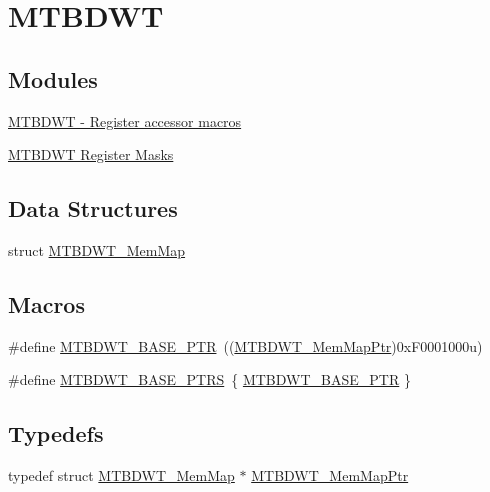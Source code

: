 \hypertarget{group___m_t_b_d_w_t___peripheral}{}\section{M\+T\+B\+D\+WT}
\label{group___m_t_b_d_w_t___peripheral}
\subsection*{Modules}
\begin{DoxyCompactItemize}
\item 
\hyperlink{group___m_t_b_d_w_t___register___accessor___macros}{M\+T\+B\+D\+W\+T -\/ Register accessor macros}
\item 
\hyperlink{group___m_t_b_d_w_t___register___masks}{M\+T\+B\+D\+W\+T Register Masks}
\end{DoxyCompactItemize}
\subsection*{Data Structures}
\begin{DoxyCompactItemize}
\item 
struct \hyperlink{struct_m_t_b_d_w_t___mem_map}{M\+T\+B\+D\+W\+T\+\_\+\+Mem\+Map}
\end{DoxyCompactItemize}
\subsection*{Macros}
\begin{DoxyCompactItemize}
\item 
\#define \hyperlink{group___m_t_b_d_w_t___peripheral_ga97d048bfb5a11293a38c444b8347ff42}{M\+T\+B\+D\+W\+T\+\_\+\+B\+A\+S\+E\+\_\+\+P\+TR}~((\hyperlink{group___m_t_b_d_w_t___peripheral_ga8dd9bf791ed255926ccd995a6236caaf}{M\+T\+B\+D\+W\+T\+\_\+\+Mem\+Map\+Ptr})0x\+F0001000u)
\item 
\#define \hyperlink{group___m_t_b_d_w_t___peripheral_ga0cbd89263cdbe0c07c59ed21112ea9ad}{M\+T\+B\+D\+W\+T\+\_\+\+B\+A\+S\+E\+\_\+\+P\+T\+RS}~\{ \hyperlink{group___m_t_b_d_w_t___peripheral_ga97d048bfb5a11293a38c444b8347ff42}{M\+T\+B\+D\+W\+T\+\_\+\+B\+A\+S\+E\+\_\+\+P\+TR} \}
\end{DoxyCompactItemize}
\subsection*{Typedefs}
\begin{DoxyCompactItemize}
\item 
typedef struct \hyperlink{struct_m_t_b_d_w_t___mem_map}{M\+T\+B\+D\+W\+T\+\_\+\+Mem\+Map} $\ast$ \hyperlink{group___m_t_b_d_w_t___peripheral_ga8dd9bf791ed255926ccd995a6236caaf}{M\+T\+B\+D\+W\+T\+\_\+\+Mem\+Map\+Ptr}
\end{DoxyCompactItemize}


